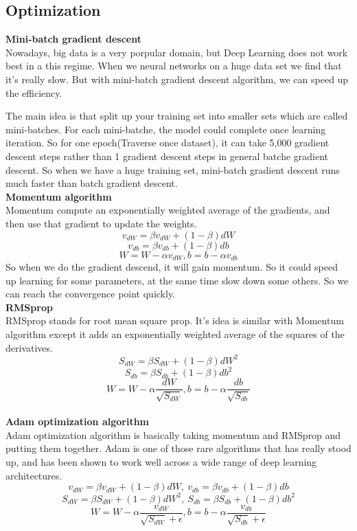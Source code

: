 \documentclass[a4paper]{article}
\begin{document}
\subsection{Optimization}

\textbf{Mini-batch gradient descent}\\
Nowadays, big data is a very porpular domain, but Deep Learning does not work best in a this regime. When we neural networks on a huge data set we find that it's really slow. But with mini-batch gradient descent algorithm, we can speed up the efficiency.

The main idea is that split up your training set into smaller sets which are called mini-batches. For each mini-batche, the model could complete once learning iteration. So for one epoch(Traverse once dataset), it can take 5,000 gradient descent steps rather than 1  gradient descent steps in general batche gradient descent. So when we have a huge training set, mini-batch gradient descent runs much faster than batch gradient descent.\\

\textbf{Momentum algorithm}\\
Momentum compute an exponentially weighted average of the gradients, and then use that gradient to update the weights.
$$v_{dW}=\beta v_{dW} + (1-\beta)dW$$
$$v_{db}=\beta v_{db}+ (1-\beta )db$$
$$W=W-\alpha v_{dW}, b = b - \alpha v_{db}$$
So when we do the gradient descend, it will gain momentum. So it could speed up learning for some parameters, at the same time slow down some others. So we can reach the convergence point quickly.\\

\textbf{RMSprop}\\
RMSprop stands for root mean square prop. It's idea is similar with Momentum algorithm except it adds an exponentially weighted average of the squares of the derivatives.
$$S_{dW}=\beta S_{dW} + (1-\beta)dW^2$$
$$S_{db}=\beta S_{db}+ (1-\beta )db^2$$
$$W=W-\alpha \frac{dW}{\sqrt{S_{dW}}}, b = b - \alpha \frac{db}{\sqrt{S_{db}}}$$\\

\textbf{Adam optimization algorithm}\\
Adam optimization algorithm is basically taking momentum and RMSprop and putting them together. Adam is one of those rare algorithms that has really stood up, and has been shown to work well across a wide range of deep learning architectures.
$$v_{dW}=\beta v_{dW} + (1-\beta)dW,\ v_{db}=\beta v_{db}+ (1-\beta )db$$
$$S_{dW}=\beta S_{dW} + (1-\beta)dW^2,\ S_{db}=\beta S_{db}+ (1-\beta )db^2$$
$$W=W-\alpha \frac{v_{dW}}{\sqrt{S_{dW}}+\epsilon}, b = b - \alpha \frac{v_{db}}{\sqrt{S_{db}}+\epsilon}$$
\end{document}
